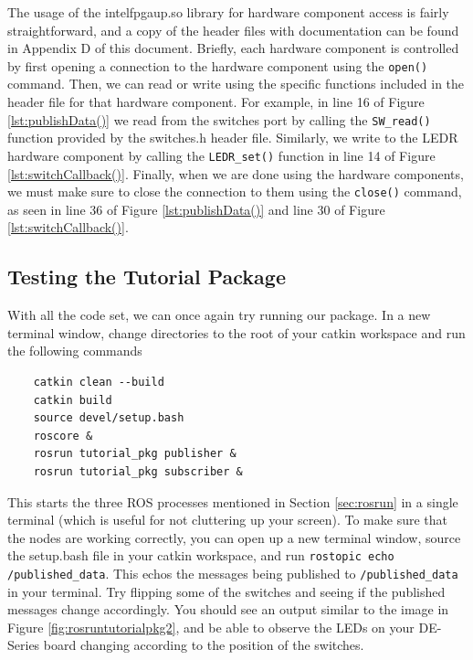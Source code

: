 \documentclass[11pt, twoside, pdftex]{article}
\begin{document}
The usage of the intelfpgaup.so library for hardware component access is fairly straightforward, and a copy of the header files with documentation can be found in Appendix D of this document. Briefly, each hardware component is controlled by first opening a connection to the hardware component using the \lstinline|open()| command. Then, we can read or write using the specific functions included in the header file for that hardware component. For example, in line 16 of Figure \ref{lst:publishData()} we read from the switches port by calling the \lstinline|SW_read()| function provided by the switches.h header file. Similarly, we write to the LEDR hardware component by calling the \lstinline|LEDR_set()| function in line 14 of Figure \ref{lst:switchCallback()}. Finally, when we are done using the hardware components, we must make sure to close the connection to them using the \lstinline|close()| command, as seen in line 36 of Figure \ref{lst:publishData()} and line 30 of Figure \ref{lst:switchCallback()}.

\subsection{Testing the Tutorial Package}
With all the code set, we can once again try running our package. In a new terminal window, change directories to the root of your catkin workspace and run the following commands  
\begin{lstlisting}
	catkin clean --build
	catkin build
	source devel/setup.bash
	roscore &
	rosrun tutorial_pkg publisher &
	rosrun tutorial_pkg subscriber &
\end{lstlisting}
This starts the three ROS processes mentioned in Section \ref{sec:rosrun} in a single terminal (which is useful for not cluttering up your screen). To make sure that the nodes are working correctly, you can open up a new terminal window, source the setup.bash file in your catkin workspace, and run \lstinline|rostopic echo /published_data|. This  echos the messages being published to \lstinline|/published_data| in your terminal. Try flipping some of the switches and seeing if the published messages change accordingly. You should see an output similar to the image in Figure \ref{fig:rosruntutorialpkg2}, and be able to observe the LEDs on your DE-Series board changing according to the position of the switches. 
\end{document}
